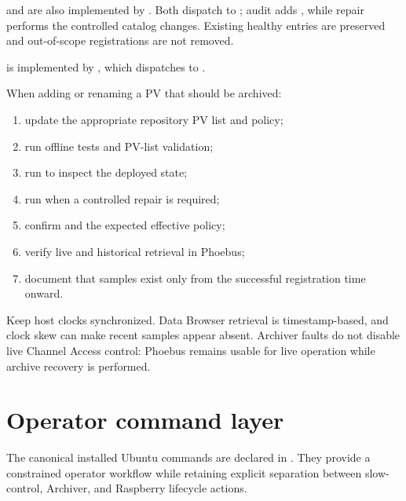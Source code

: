  and  are also implemented by . Both dispatch to ; audit adds , while repair performs the controlled catalog changes. Existing healthy entries are preserved and out-of-scope registrations are not removed.

 is implemented by , which dispatches to .

When adding or renaming a PV that should be archived:

\begin{enumerate}
  \item update the appropriate repository PV list and policy;
  \item run offline tests and PV-list validation;
  \item run  to inspect the deployed state;
  \item run  when a controlled repair is required;
  \item confirm  and the expected effective policy;
  \item verify live and historical retrieval in Phoebus;
  \item document that samples exist only from the successful registration time onward.
\end{enumerate}

Keep host clocks synchronized. Data Browser retrieval is timestamp-based, and clock skew can make recent samples appear absent. Archiver faults do not disable live Channel Access control: Phoebus remains usable for live operation while archive recovery is performed.

\section{Operator command layer}

The canonical installed Ubuntu commands are declared in . They provide a constrained operator workflow while retaining explicit separation between slow-control, Archiver, and Raspberry lifecycle actions.

